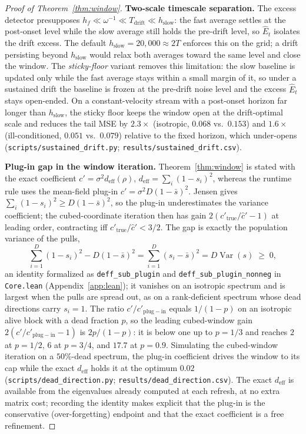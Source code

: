 \begin{proof}[Proof of Theorem~\ref{thm:window}]
\textbf{Two-scale timescale separation.}
The excess detector presupposes $h_f \ll \omega^{-1} \ll T_{\mathrm{drift}} \ll h_{\mathrm{slow}}$: the fast average settles at the post-onset level while the slow average still holds the pre-drift level, so $\widehat E_t$ isolates the drift excess.
The default $h_{\mathrm{slow}} = 20{,}000 \approx 2T$ enforces this on the grid; a drift persisting beyond $h_{\mathrm{slow}}$ would relax both averages toward the same level and close the window.
The \emph{sticky-floor} variant removes this limitation: the slow baseline is updated only while the fast average stays within a small margin of it, so under a sustained drift the baseline is frozen at the pre-drift noise level and the excess $\widehat E_t$ stays open-ended. On a constant-velocity stream with a post-onset horizon far longer than $h_{\mathrm{slow}}$, the sticky floor keeps the window open at the drift-optimal scale and reduces the tail MSE by $2.3\times$ (isotropic, $0.068$ vs.\ $0.153$) and $1.6\times$ (ill-conditioned, $0.051$ vs.\ $0.079$) relative to the fixed horizon, which under-opens (\texttt{scripts/sustained\_drift.py}; \texttt{results/sustained\_drift.csv}).

\textbf{Plug-in gap in the window iteration.}
Theorem~\ref{thm:window} is stated with the exact coefficient $c' = \sigma^2 d_{\mathrm{eff}}(\rho)$, $d_{\mathrm{eff}} = \sum_i (1-s_i)^2$, whereas the runtime rule uses the mean-field plug-in $\widehat c' = \sigma^2 D(1-\bar s)^2$.
Jensen gives $\sum_i (1-s_i)^2 \ge D(1-\bar s)^2$, so the plug-in underestimates the variance coefficient; the cubed-coordinate iteration then has gain $2(c'_{\mathrm{true}}/\widehat c' - 1)$ at leading order, contracting iff $c'_{\mathrm{true}}/\widehat c' < 3/2$.
The gap is exactly the population variance of the pulls,
\[
\sum_{i=1}^D (1-s_i)^2 - D(1-\bar s)^2
= \sum_{i=1}^D (s_i-\bar s)^2 = D\operatorname{Var}(s) \;\ge\; 0,
\]
an identity formalized as \texttt{deff\_sub\_plugin} and \texttt{deff\_sub\_plugin\_nonneg} in \texttt{Core.lean} (Appendix~\ref{app:lean}); it vanishes on an isotropic spectrum and is largest when the pulls are spread out, as on a rank-deficient spectrum whose dead directions carry $s_i = 1$.
The ratio $c'/c'_{\mathrm{plug\!-\!in}}$ equals $1/(1-p)$ on an isotropic alive block with a dead fraction $p$, so the leading cubed-window gain $2(c'/c'_{\mathrm{plug\!-\!in}}-1)$ is $2p/(1-p)$: it is below one up to $p=1/3$ and reaches $2$ at $p=1/2$, $6$ at $p=3/4$, and $17.7$ at $p=0.9$. Simulating the cubed-window iteration on a $50\%$-dead spectrum, the plug-in coefficient drives the window to its cap while the exact $d_{\mathrm{eff}}$ holds it at the optimum $0.02$ (\texttt{scripts/dead\_direction.py}; \texttt{results/dead\_direction.csv}).
The exact $d_{\mathrm{eff}}$ is available from the eigenvalues already computed at each refresh, at no extra matrix cost; recording the identity makes explicit that the plug-in is the conservative (over-forgetting) endpoint and that the exact coefficient is a free refinement.


\end{proof}
